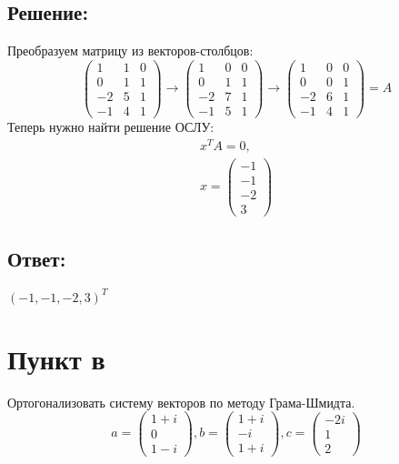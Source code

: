 \documentclass[12pt]{article}
\begin{document}
    \subsection*{Решение:}
    Преобразуем матрицу из векторов-столбцов:
    \[
        \begin{pmatrix}
            1  & 1 & 0 \\
            0  & 1 & 1 \\
            -2 & 5 & 1 \\
            -1 & 4 & 1
        \end{pmatrix}
        \rightarrow
        \begin{pmatrix}
            1  & 0 & 0 \\
            0  & 1 & 1 \\
            -2 & 7 & 1 \\
            -1 & 5 & 1
        \end{pmatrix}
        \rightarrow
        \begin{pmatrix}
            1  & 0 & 0 \\
            0  & 0 & 1 \\
            -2 & 6 & 1 \\
            -1 & 4 & 1
        \end{pmatrix}
        = A
    \]
    Теперь нужно найти решение ОСЛУ:
    \begin{gather*}
        x^T A = 0, \\
        x =
        \begin{pmatrix}
            -1 \\
            -1 \\
            -2 \\
            3
        \end{pmatrix}
    \end{gather*}

    \subsection*{Ответ:}
    $\left ( -1, -1, -2, 3 \right )^T$

    \section*{Пункт в}
    Ортогонализовать систему векторов по методу Грама-Шмидта.
    \[
        a =
        \begin{pmatrix}
            1 + i \\
            0     \\
            1 - i
        \end{pmatrix},
        b =
        \begin{pmatrix}
            1 + i \\
            -i    \\
            1 + i
        \end{pmatrix},
        c =
        \begin{pmatrix}
            -2 i \\
            1    \\
            2
        \end{pmatrix}
    \]
\end{document}

